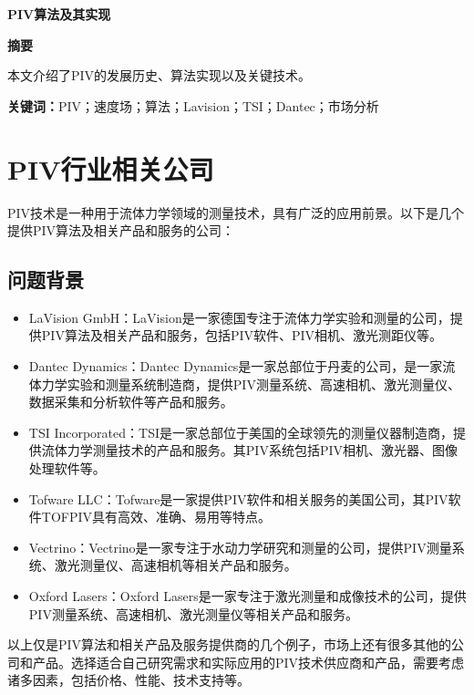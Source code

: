 \documentclass[12pt, a4paper, oneside]{ctexart}
\begin{document}
\pagestyle{empty}
\setcounter{page}{0}

\begin{center}
    \Large{\textbf{PIV算法及其实现}}
\end{center}

\begin{center}
    \Large{\textbf{摘要}}
\end{center}

本文介绍了PIV的发展历史、算法实现以及关键技术。

\textbf{关键词：}PIV；速度场；算法；Lavision；TSI；Dantec；市场分析

\newpage
\setcounter{page}{1}
\pagestyle{plain}
\fancyfoot[C]{\thepage}

\section{PIV行业相关公司}

PIV技术是一种用于流体力学领域的测量技术，具有广泛的应用前景。以下是几个提供PIV算法及相关产品和服务的公司：

\subsection{问题背景}


\begin{itemize}
\item LaVision GmbH：LaVision是一家德国专注于流体力学实验和测量的公司，提供PIV算法及相关产品和服务，包括PIV软件、PIV相机、激光测距仪等。
\item Dantec Dynamics：Dantec Dynamics是一家总部位于丹麦的公司，是一家流体力学实验和测量系统制造商，提供PIV测量系统、高速相机、激光测量仪、数据采集和分析软件等产品和服务。
\item TSI Incorporated：TSI是一家总部位于美国的全球领先的测量仪器制造商，提供流体力学测量技术的产品和服务。其PIV系统包括PIV相机、激光器、图像处理软件等。
\item Tofware LLC：Tofware是一家提供PIV软件和相关服务的美国公司，其PIV软件TOFPIV具有高效、准确、易用等特点。
\item Vectrino：Vectrino是一家专注于水动力学研究和测量的公司，提供PIV测量系统、激光测量仪、高速相机等相关产品和服务。
\item Oxford Lasers：Oxford Lasers是一家专注于激光测量和成像技术的公司，提供PIV测量系统、高速相机、激光测量仪等相关产品和服务。
\end{itemize}
以上仅是PIV算法和相关产品及服务提供商的几个例子，市场上还有很多其他的公司和产品。选择适合自己研究需求和实际应用的PIV技术供应商和产品，需要考虑诸多因素，包括价格、性能、技术支持等。
\end{document}
